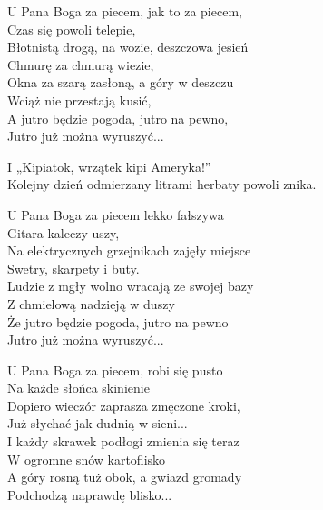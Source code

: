 \begin{text}
    \small{
    U Pana Boga za piecem, jak to za piecem,\\
    Czas się powoli telepie,\\
    Błotnistą drogą, na wozie, deszczowa jesień\\
    Chmurę za chmurą wiezie,\\
    Okna za szarą zasłoną, a góry w deszczu\\
    Wciąż nie przestają kusić,\\
    A jutro będzie pogoda, jutro na pewno,\\
    Jutro już można wyruszyć...

    I „Kipiatok, wrzątek kipi Ameryka!”\\
    Kolejny dzień odmierzany litrami herbaty powoli znika.

    U Pana Boga za piecem lekko fałszywa\\
    Gitara kaleczy uszy,\\
    Na elektrycznych grzejnikach zajęły miejsce\\
    Swetry, skarpety i buty.\\
    Ludzie z mgły wolno wracają ze swojej bazy\\
    Z chmielową nadzieją w duszy\\
    Że jutro będzie pogoda, jutro na pewno\\
    Jutro już można wyruszyć...

    U Pana Boga za piecem, robi się pusto\\
    Na każde słońca skinienie\\
    Dopiero wieczór zaprasza zmęczone kroki,\\
    Już słychać jak dudnią w sieni...\\
    I każdy skrawek podłogi zmienia się teraz\\
    W ogromne snów kartoflisko\\
    A góry rosną tuż obok, a gwiazd gromady\\
    Podchodzą naprawdę blisko...
    }
\end{text}
\begin{chord}

\end{chord}